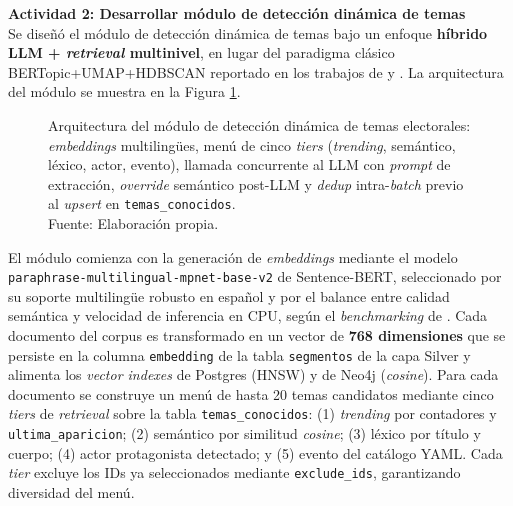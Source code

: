 \textbf{Actividad 2: Desarrollar módulo de detección dinámica de temas}
\\
Se diseñó el módulo de detección dinámica de temas bajo un enfoque \textbf{híbrido
LLM + \textit{retrieval} multinivel}, en lugar del paradigma clásico
BERTopic+UMAP+HDBSCAN reportado en los trabajos de
\cite{pr_mendonca2025bertopic_political} y \cite{pr_janssens2025bertopic_llm}. La
arquitectura del módulo se muestra en la Figura \ref{6:fig2}.

\begin{figure}[!ht]
    \begin{center}
        \resizebox{0.85\textwidth}{!}{}
        \caption[Arquitectura del módulo de detección dinámica de temas con LLM y retrieval multinivel]{Arquitectura del módulo de detección dinámica de temas electorales: \textit{embeddings} multilingües, menú de cinco \textit{tiers} (\textit{trending}, semántico, léxico, actor, evento), llamada concurrente al LLM con \textit{prompt} de extracción, \textit{override} semántico post-LLM y \textit{dedup} intra-\textit{batch} previo al \textit{upsert} en \texttt{temas\_conocidos}.\\Fuente: Elaboración propia.}
        \label{6:fig2}
    \end{center}
\end{figure}

El módulo comienza con la generación de \textit{embeddings} mediante el modelo
\texttt{paraphrase-multilingual-mpnet-base-v2} de Sentence-BERT, seleccionado por
su soporte multilingüe robusto en español y por el balance entre calidad semántica
y velocidad de inferencia en CPU, según el \textit{benchmarking} de
\cite{mc_reimers2019sbert}. Cada documento del corpus es transformado en un vector
de \textbf{768 dimensiones} que se persiste en la columna \texttt{embedding} de la
tabla \texttt{segmentos} de la capa Silver y alimenta los \textit{vector indexes}
de Postgres (HNSW) y de Neo4j (\textit{cosine}). Para cada documento se construye
un menú de hasta 20 temas candidatos mediante cinco \textit{tiers} de
\textit{retrieval} sobre la tabla \texttt{temas\_conocidos}: (1) \textit{trending}
por contadores y \texttt{ultima\_aparicion}; (2) semántico por similitud
\textit{cosine}; (3) léxico por título y cuerpo; (4) actor protagonista detectado;
y (5) evento del catálogo YAML. Cada \textit{tier} excluye los IDs ya seleccionados
mediante \texttt{exclude\_ids}, garantizando diversidad del menú.

